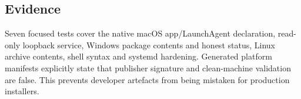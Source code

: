 \subsection{Evidence}

Seven focused tests cover the native macOS app/LaunchAgent declaration, read-only loopback service,
Windows package contents and honest status, Linux archive contents, shell syntax and systemd
hardening. Generated platform manifests explicitly state that publisher signature and clean-machine
validation are false. This prevents developer artefacts from being mistaken for production
installers.
